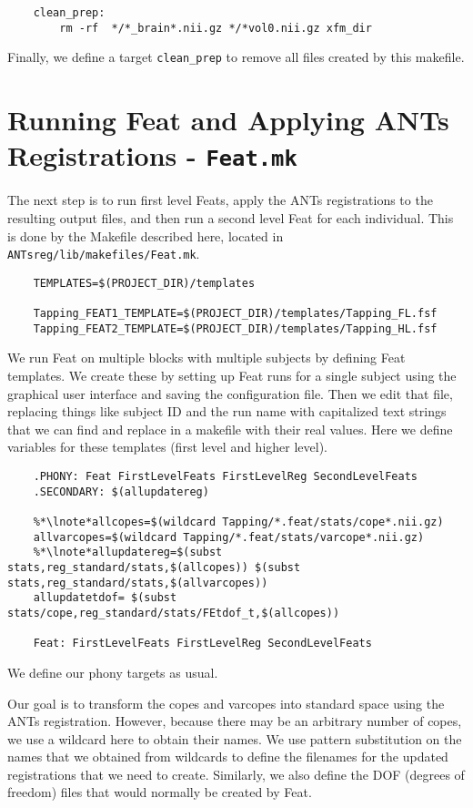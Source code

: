\begin{lstlisting}
	clean_prep:
		rm -rf  */*_brain*.nii.gz */*vol0.nii.gz xfm_dir
\end{lstlisting}

Finally, we define a target \texttt{clean_prep} to remove all files
created by this makefile.


\section{Running Feat and Applying ANTs Registrations -
  \texttt{Feat.mk}}
The next step is to run first level Feats, apply the ANTs
registrations to the resulting output files, and then run a second
level Feat for each individual. This is done by the Makefile described
here, located in \texttt{ANTsreg/lib/makefiles/Feat.mk}.

\begin{lstlisting}
	TEMPLATES=$(PROJECT_DIR)/templates

	Tapping_FEAT1_TEMPLATE=$(PROJECT_DIR)/templates/Tapping_FL.fsf
	Tapping_FEAT2_TEMPLATE=$(PROJECT_DIR)/templates/Tapping_HL.fsf	
\end{lstlisting}

We run Feat on multiple blocks with multiple subjects by defining Feat
templates. We create these by setting up Feat runs for a single
subject using the graphical user interface and saving the
configuration file. Then we edit that file, replacing things like
subject ID and the run name with capitalized text strings that we can
find and replace in a makefile with their real values. Here we define
variables for these templates (first level and higher level).


\begin{lstlisting}
	.PHONY: Feat FirstLevelFeats FirstLevelReg SecondLevelFeats
	.SECONDARY: $(allupdatereg)

	%*\lnote*allcopes=$(wildcard Tapping/*.feat/stats/cope*.nii.gz)
	allvarcopes=$(wildcard Tapping/*.feat/stats/varcope*.nii.gz)
	%*\lnote*allupdatereg=$(subst stats,reg_standard/stats,$(allcopes)) $(subst stats,reg_standard/stats,$(allvarcopes))
	allupdatetdof= $(subst stats/cope,reg_standard/stats/FEtdof_t,$(allcopes)) 

	Feat: FirstLevelFeats FirstLevelReg SecondLevelFeats
\end{lstlisting}
We define our phony targets as usual. 

Our goal is to transform the copes and varcopes into standard space
using the ANTs registration.  However, because there may be an
arbitrary number of copes, we use a wildcard here to obtain their
names.  We use pattern substitution on the names that we
obtained from wildcards to define the filenames for the updated
registrations that we need to create. Similarly, we also define the
DOF (degrees of freedom) files that would normally be created by Feat.


